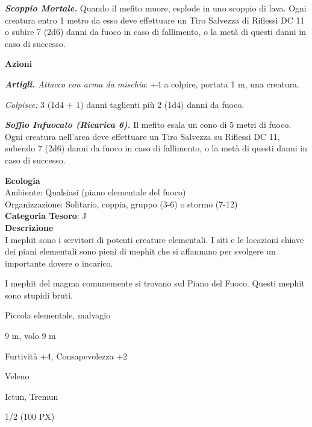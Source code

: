 \begin{multicols}{2}
{\emph{\textbf{Scoppio Mortale.}} Quando il mefito muore, esplode in uno scoppio di lava. Ogni creatura entro 1 metro da esso deve effettuare un Tiro Salvezza di Riflessi DC 11 o subire 7 (2d6) danni da fuoco in caso di fallimento, o la metà di questi danni in caso di successo.

\textbf{Azioni}

\emph{\textbf{Artigli.} Attacco con arma da mischia}: +4 a colpire, portata 1 m, una creatura.

\emph{Colpisce:} 3 (1d4 + 1) danni taglienti più 2 (1d4) danni da fuoco.

\emph{\textbf{Soffio Infuocato (Ricarica 6).}} Il mefito esala un cono di 5 metri di fuoco. Ogni creatura nell'area deve effettuare un Tiro Salvezza su Riflessi DC 11, subendo 7 (2d6) danni da fuoco in caso di fallimento, o la metà di questi danni in caso di successo.

\textbf{Ecologia}\\
Ambiente: Qualsiasi (piano elementale del fuoco)\\
Organizzazione: Solitario, coppia, gruppo (3-6) o stormo (7-12)\\
\textbf{Categoria Tesoro}: J\\
\textbf{Descrizione}\\
I mephit sono i servitori di potenti creature elementali. I siti e le locazioni chiave dei piani elementali sono pieni di mephit che si affannano per svolgere un importante dovere o incarico.

I mephit del magma comunemente si trovano sul Piano del Fuoco. Questi mephit sono stupidi bruti.

\begin{description}[noitemsep, topsep=0pt, parsep=0pt, partopsep=0pt, itemsep=1pt, leftmargin=2.35cm,  labelwidth=2.2cm, itemindent=0cm, listparindent=0pt] %
\setlength{\baselineskip}{10pt}
\item[\textbf{Taglia/Tipo}] Piccola elementale, malvagio
\item[\textbf{Caratt.}] 
\item[\textbf{Punti Ferita}] 
\item[\textbf{Movimento}] 9 m, volo 9 m
\item[\textbf{Tiri Salvez.}] 
\item[\textbf{Comp.}] Furtività +4, Consapevolezza +2
\item[\textbf{Imm. Danni}] Veleno
\item[\textbf{Sensi}] 
\item[\textbf{Linguaggi}] Ictun, Tremun
\item[\textbf{Sfida}] 1/2 (100 PX)
\end{description}
\smallskip

}
\end{multicols}
